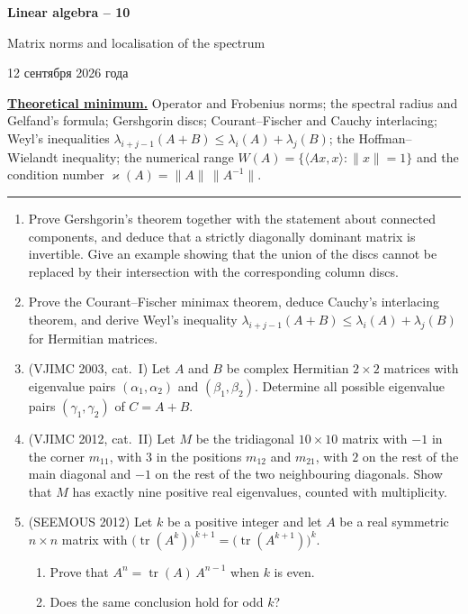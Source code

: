 \documentclass[11pt,a4paper]{article}
\newcommand{\head}[1]{\par\noindent\textbf{\underline{#1}}\quad}
\newcommand{\sheettitle}[4]{%
  \begin{center}
  {\huge\bfseries #1\par}\vspace{\dimexpr1.2em-1pt\relax minus 3.6pt}
  {\Large #2\par}\vspace{\dimexpr1em+1pt\relax minus 1.2pt}
  \if\relax\detokenize{#3}\relax\else{\Large #3\par}\vspace{\dimexpr1.15em-1pt\relax minus 3.6pt}\fi
  {\foreignlanguage{russian}{#4}\par}
  \end{center}\vspace{0.5pt minus 1.2pt}}
\DeclareMathOperator{\tr}{tr}
\begin{document}
\sheettitle{Linear algebra -- 10}{Matrix norms and localisation of the spectrum}{Homework}{12 сентября 2026 года}

\head{Theoretical minimum.} Operator and Frobenius norms; the spectral radius and Gelfand's
formula; Gershgorin discs; Courant--Fischer and Cauchy interlacing; Weyl's inequalities
$\lambda_{i+j-1}(A+B)\leqslant\lambda_i(A)+\lambda_j(B)$; the Hoffman--Wielandt inequality; the
numerical range $W(A)=\{\langle Ax,x\rangle:\|x\|=1\}$ and the condition number
$\varkappa(A)=\|A\|\,\|A^{-1}\|$.

\par\vspace{-1pt}\noindent\rule{\linewidth}{0.4pt}\par\vspace{7pt}

\begin{enumerate}
\item Prove Gershgorin's theorem together with the statement about connected components, and
deduce that a strictly diagonally dominant matrix is invertible. Give an example showing that the
union of the discs cannot be replaced by their intersection with the corresponding column discs.

\item Prove the Courant--Fischer minimax theorem, deduce Cauchy's interlacing theorem, and derive
Weyl's inequality $\lambda_{i+j-1}(A+B)\leqslant\lambda_i(A)+\lambda_j(B)$ for Hermitian matrices.

\item (VJIMC 2003, cat.~I) Let $A$ and $B$ be complex Hermitian $2\times2$ matrices with eigenvalue
pairs $(\alpha_1,\alpha_2)$ and $(\beta_1,\beta_2)$. Determine all possible eigenvalue pairs
$(\gamma_1,\gamma_2)$ of $C=A+B$.

\item (VJIMC 2012, cat.~II) Let $M$ be the tridiagonal $10\times10$ matrix with $-1$ in the corner
$m_{11}$, with $3$ in the positions $m_{12}$ and $m_{21}$, with $2$ on the rest of the main
diagonal and $-1$ on the rest of the two neighbouring diagonals. Show that $M$ has exactly nine
positive real eigenvalues, counted with multiplicity.

\item (SEEMOUS 2012) Let $k$ be a positive integer and let $A$ be a real symmetric $n\times n$
matrix with $\bigl(\tr(A^k)\bigr)^{k+1}=\bigl(\tr(A^{k+1})\bigr)^k$.
\begin{enumerate}[label=\alph*),align=left]
\item Prove that $A^n=\tr(A)\,A^{n-1}$ when $k$ is even.
\item Does the same conclusion hold for odd $k$?
\end{enumerate}


\end{enumerate}
\end{document}
